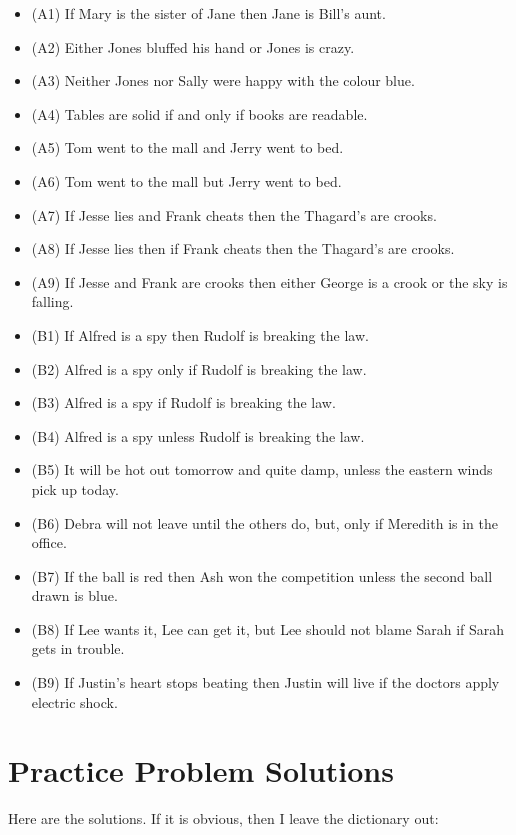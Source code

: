 \documentclass[
]{book}
\providecommand{\tightlist}{%
  \setlength{\itemsep}{0pt}\setlength{\parskip}{0pt}}
\begin{document}
\begin{itemize}
\tightlist
\item
  (A1) If Mary is the sister of Jane then Jane is Bill's aunt.
\item
  (A2) Either Jones bluffed his hand or Jones is crazy.
\item
  (A3) Neither Jones nor Sally were happy with the colour blue.
\item
  (A4) Tables are solid if and only if books are readable.
\item
  (A5) Tom went to the mall and Jerry went to bed.
\item
  (A6) Tom went to the mall but Jerry went to bed.
\item
  (A7) If Jesse lies and Frank cheats then the Thagard's are crooks.
\item
  (A8) If Jesse lies then if Frank cheats then the Thagard's are crooks.
\item
  (A9) If Jesse and Frank are crooks then either George is a crook or the sky is falling.
\item
  (B1) If Alfred is a spy then Rudolf is breaking the law.
\item
  (B2) Alfred is a spy only if Rudolf is breaking the law.
\item
  (B3) Alfred is a spy if Rudolf is breaking the law.
\item
  (B4) Alfred is a spy unless Rudolf is breaking the law.
\item
  (B5) It will be hot out tomorrow and quite damp, unless the eastern winds pick up today.
\item
  (B6) Debra will not leave until the others do, but, only if Meredith is in the office.
\item
  (B7) If the ball is red then Ash won the competition unless the second ball drawn is blue.
\item
  (B8) If Lee wants it, Lee can get it, but Lee should not blame Sarah if Sarah gets in trouble.
\item
  (B9) If Justin's heart stops beating then Justin will live if the doctors apply electric shock.
\end{itemize}

\hypertarget{practice-problem-solutions}{%
\section{Practice Problem Solutions}\label{practice-problem-solutions}}

Here are the solutions. If it is obvious, then I leave the dictionary out:
\end{document}

